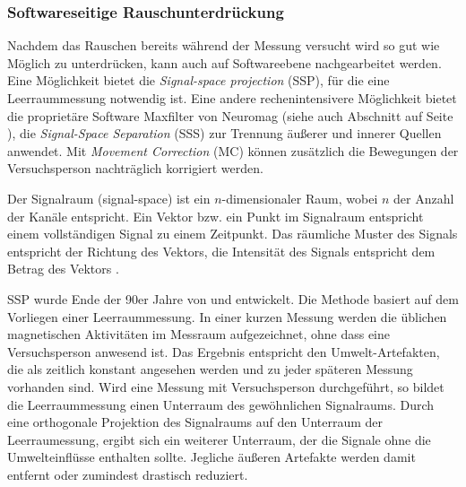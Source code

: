 \documentclass[doc,a4paper,12pt]{apa6}
\makeatletter
\DeclareRobustCommand*{\nameref}[1]{%
      \glqq{\myorg@nameref{#1}}\grqq%
    }%
\makeatother
\begin{document}
\subsubsection{Softwareseitige Rauschunterdrückung}
\label{sec:maxfilter}

Nachdem das Rauschen bereits während der Messung versucht wird so gut wie Möglich zu unterdrücken, kann auch auf Softwareebene nachgearbeitet werden. Eine Möglichkeit bietet die \emph{Signal-space projection} (SSP), für die eine Leerraummessung notwendig ist. Eine andere rechenintensivere Möglichkeit bietet die proprietäre Software Maxfilter von Neuromag (siehe auch Abschnitt \nameref{sec:software} auf Seite \pageref{sec:software}), die \emph{Signal-Space Separation} (SSS) zur Trennung äußerer und innerer Quellen anwendet. Mit \emph{Movement Correction} (MC) können zusätzlich die Bewegungen der Versuchsperson nachträglich korrigiert werden.

Der Signalraum (signal-space) ist ein $n$-dimensionaler Raum, wobei $n$ der Anzahl der Kanäle entspricht. Ein Vektor bzw. ein Punkt im Signalraum entspricht einem vollständigen Signal zu einem Zeitpunkt. Das räumliche Muster des Signals entspricht der Richtung des Vektors, die Intensität des Signals entspricht dem Betrag des Vektors \parencite{hansen2010meg}.

SSP wurde Ende der 90er Jahre von \textcite{uusitalo1997signal} und \textcite{parkkonen1999interference} entwickelt. Die Methode basiert auf dem Vorliegen einer Leerraummessung. In einer kurzen Messung werden die üblichen magnetischen Aktivitäten im Messraum aufgezeichnet, ohne dass eine Versuchsperson anwesend ist. Das Ergebnis entspricht den Umwelt-Artefakten, die als zeitlich konstant angesehen werden und zu jeder späteren Messung vorhanden sind. Wird eine Messung mit Versuchsperson durchgeführt, so bildet die Leerraummessung einen Unterraum des gewöhnlichen Signalraums. Durch eine orthogonale Projektion des Signalraums auf den Unterraum der Leerraumessung, ergibt sich ein weiterer Unterraum, der die Signale ohne die Umwelteinflüsse enthalten sollte. Jegliche äußeren Artefakte werden damit entfernt oder zumindest drastisch reduziert.
\end{document}

